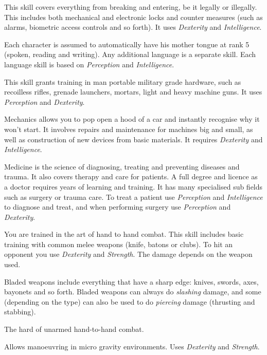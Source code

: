 \begin{description}
   This skill covers everything from breaking and entering,
  be it legally or illegally. This includes both mechanical and electronic
  locks and counter measures (such as alarms, biometric access controls and so
  forth). It uses \emph{Dexterity} and \emph{Intelligence}.

   Each character is assumed to automatically have his mother
  tongue at rank 5 (spoken, reading and writing). Any additional language is a
  separate skill. Each language skill is based on \emph{Perception} and
  \emph{Intelligence}.

   This skill grants training in man portable military
  grade hardware, such as recoilless rifles, grenade launchers, mortars, light
  and heavy machine guns. It uses \emph{Perception} and \emph{Dexterity}.

   Mechanics allows you to pop open a hood of a car and
  instantly recognise why it won't start. It involves repairs and maintenance
  for machines big and small, as well as construction of new devices
  from basic materials. It requires \emph{Dexterity} and
  \emph{Intelligence}.

   Medicine is the science of diagnosing, treating and
  preventing diseases and trauma. It also covers therapy and care for patients.
  A full degree and licence as a doctor requires years of learning and training.
  It has many specialised sub fields such as surgery or trauma care. To treat a
  patient use \emph{Perception} and \emph{Intelligence} to diagnose and treat,
  and when performing surgery use \emph{Perception} and \emph{Dexterity}.

   You are trained in the art of hand to hand combat. This
  skill includes basic training with common melee weapons (knife, batons or
  clubs). To hit an opponent you use \emph{Dexterity} and \emph{Strength}.
  The damage depends on the weapon used.

   Bladed weapons include everything that have a
  sharp edge: knives, swords, axes, bayonets and so forth. Bladed weapons can
  always do \emph{slashing} damage, and some (depending on the type) can also
  be used to do \emph{piercing} damage (thrusting and stabbing).

   The hard of unarmed hand-to-hand combat.

   Allows manoeuvring in micro gravity environments. Uses
  \emph{Dexterity} and \emph{Strength}.


\end{description}
